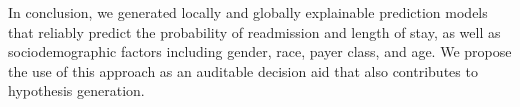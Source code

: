 In conclusion, we generated locally and globally explainable prediction models 
that reliably predict the probability of readmission and length of stay, 
as well as sociodemographic factors including gender, race, payer class, and age.
We propose the use of this approach as an auditable decision aid that also contributes 
to hypothesis generation.




